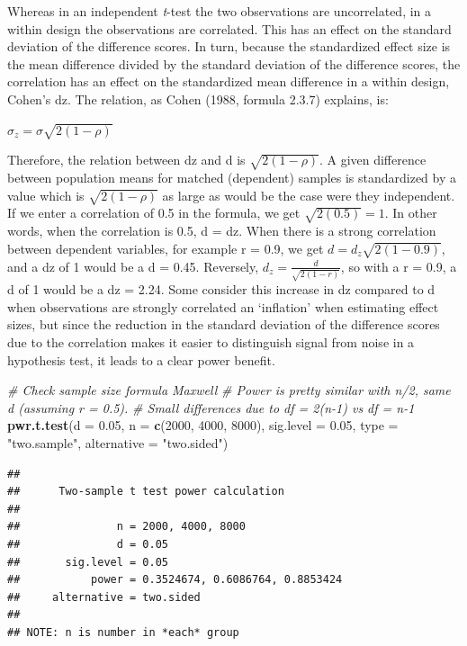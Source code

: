 \documentclass[
]{book}
\newenvironment{Shaded}{\begin{snugshade}}{\end{snugshade}}
\newcommand{\CommentTok}[1]{\textcolor[rgb]{0.56,0.35,0.01}{\textit{#1}}}
\newcommand{\DataTypeTok}[1]{\textcolor[rgb]{0.13,0.29,0.53}{#1}}
\newcommand{\DecValTok}[1]{\textcolor[rgb]{0.00,0.00,0.81}{#1}}
\newcommand{\FloatTok}[1]{\textcolor[rgb]{0.00,0.00,0.81}{#1}}
\newcommand{\KeywordTok}[1]{\textcolor[rgb]{0.13,0.29,0.53}{\textbf{#1}}}
\newcommand{\NormalTok}[1]{#1}
\newcommand{\StringTok}[1]{\textcolor[rgb]{0.31,0.60,0.02}{#1}}
\begin{document}
Whereas in an independent \emph{t}-test the two observations are uncorrelated, in a within design the observations are correlated. This has an effect on the standard deviation of the difference scores. In turn, because the standardized effect size is the mean difference divided by the standard deviation of the difference scores, the correlation has an effect on the standardized mean difference in a within design, Cohen's dz. The relation, as Cohen (1988, formula 2.3.7) explains, is:

\(\sigma_{z}=\sigma\sqrt{2(1-\rho)}\)

Therefore, the relation between dz and d is \(\sqrt{2(1-\rho)}\). A given difference between population means for matched (dependent) samples is standardized by a value which is \(\sqrt{2(1-\rho)}\) as large as would be the case were they independent. If we enter a correlation of 0.5 in the formula, we get \(\sqrt{2(0.5)}=1\). In other words, when the correlation is 0.5, d = dz. When there is a strong correlation between dependent variables, for example r = 0.9, we get \(d=d_{z}\sqrt{2(1-0.9)}\), and a dz of 1 would be a d = 0.45. Reversely, \(d_{z}=\frac{d}{\sqrt{2(1-r)}}\), so with a r = 0.9, a d of 1 would be a dz = 2.24. Some consider this increase in dz compared to d when observations are strongly correlated an `inflation' when estimating effect sizes, but since the reduction in the standard deviation of the difference scores due to the correlation makes it easier to distinguish signal from noise in a hypothesis test, it leads to a clear power benefit.

\newpage

\begin{Shaded}
\begin{Highlighting}[]
\CommentTok{# Check sample size formula Maxwell}
\CommentTok{# Power is pretty similar with n/2, same d (assuming r = 0.5). }
\CommentTok{# Small differences due to df = 2(n-1) vs df = n-1}
\KeywordTok{pwr.t.test}\NormalTok{(}\DataTypeTok{d =} \FloatTok{0.05}\NormalTok{,}
           \DataTypeTok{n =} \KeywordTok{c}\NormalTok{(}\DecValTok{2000}\NormalTok{, }\DecValTok{4000}\NormalTok{, }\DecValTok{8000}\NormalTok{),}
           \DataTypeTok{sig.level =} \FloatTok{0.05}\NormalTok{,}
           \DataTypeTok{type =} \StringTok{"two.sample"}\NormalTok{,}
           \DataTypeTok{alternative =} \StringTok{"two.sided"}\NormalTok{)}
\end{Highlighting}
\end{Shaded}

\begin{verbatim}
## 
##      Two-sample t test power calculation 
## 
##               n = 2000, 4000, 8000
##               d = 0.05
##       sig.level = 0.05
##           power = 0.3524674, 0.6086764, 0.8853424
##     alternative = two.sided
## 
## NOTE: n is number in *each* group
\end{verbatim}
\end{document}
